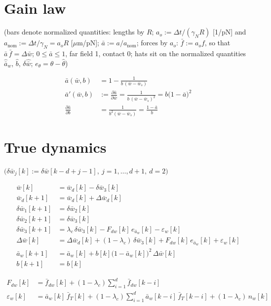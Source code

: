 \documentclass[11pt,a4paper,fontset=none]{ctexart}
\newcommand{\ba}{\bar{a}}
\newcommand{\bw}{\bar{w}}
\newcommand{\dW}{\Delta\bw}
\newcommand{\ap}{\ba'}
\newcommand{\ah}{\hat{\ba}_w}
\newcommand{\bh}{\hat{b}}
\begin{document}
\section{Gain law}

(bars denote normalized quantities: lengths by $R$; $a_o := \Delta t/(\gamma_N R)$ [1/pN] and $a_{\mathrm{nom}} := \Delta t/\gamma_N = a_o R$ [$\mu$m/pN];
$\ba := a/a_{\mathrm{nom}}$; forces by $a_o$: $\bar f := a_o f$, so that $\ba\,\bar f = \dW$; $0 \le \ba \le 1$, far field 1, contact 0;
hats sit on the normalized quantities $\ah$, $\bh$, $\delta\hat{\bw}$; $e_\theta = \theta - \hat\theta$)

\begin{align*}
\ba(\bw, b) &= 1 - \frac{1}{b\,(\bw - \bw_s)} \\
\ap(\bw, b) &:= \frac{\partial\ba}{\partial\bw} = \frac{1}{b\,(\bw - \bw_s)^{2}} = b\bigl(1-\ba\bigr)^{2} \\
\frac{\partial\ba}{\partial b} &= \frac{1}{b^{2}(\bw - \bw_s)} = \frac{1-\ba}{b}
\end{align*}

\section{True dynamics}

$\bigl(\delta\bw_j[k] := \delta\bw[k-d+j-1],\ j = 1,\dots,d+1,\ d = 2\bigr)$

\begin{align*}
\bw[k]           &= \bw_d[k] - \delta\bw_3[k] \\
\bw_d[k+1]       &= \bw_d[k] + \Delta\bw_d[k] \\
\delta\bw_1[k+1] &= \delta\bw_2[k] \\
\delta\bw_2[k+1] &= \delta\bw_3[k] \\
\delta\bw_3[k+1] &= \lambda_c\,\delta\bw_3[k] - F_{dw}[k]\,e_{\ba_w}[k] - \varepsilon_w[k] \\
\dW[k]           &= \Delta\bw_d[k] + (1-\lambda_c)\,\delta\bw_3[k] + F_{dw}[k]\,e_{\ba_w}[k] + \varepsilon_w[k] \\
\ba_w[k+1]       &= \ba_w[k] + b[k]\bigl(1-\ba_w[k]\bigr)^{2}\,\dW[k] \\
b[k+1]           &= b[k]
\end{align*}

\begin{align*}
F_{dw}[k]        &= \bar f_{dw}[k] + (1-\lambda_c)\sum_{i=1}^{d}\bar f_{dw}[k-i] \\
\varepsilon_w[k] &= \ba_w[k]\,\bar f_T[k] + (1-\lambda_c)\sum_{i=1}^{d}\ba_w[k-i]\,\bar f_T[k-i] + (1-\lambda_c)\,n_w[k]
\end{align*}
\end{document}
